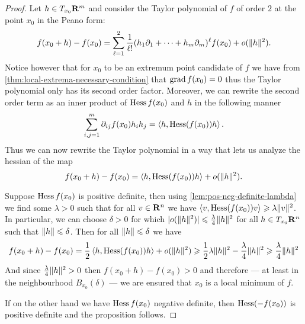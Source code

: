 \begin{proof}
  Let \(h \in T_{x_0}\mathbf{R}^m\) and consider the Taylor polynomial of \(f\) of order
  \(2\) at the point \(x_0\) in the Peano form:
  \[
    f(x_0 + h) - f(x_0) = \sum_{\ell=1}^2 \frac{1}{\ell!} (h_1 \partial_1 + \dots + h_m \partial_m)^{\ell}
    f(x_0) + o(\lVert h\rVert^2).
  \]
  Notice however that for \(x_0\) to be an extremum point candidate of \(f\) we
  have from \cref{thm:local-extrema-necessary-condition} that \(\operatorname{grad} f(x_0) =
  0\) thus the Taylor polynomial only has its second order factor. Moreover, we
  can rewrite the second order term as an inner product of \(\operatorname{Hess} f(x_0)\) and
  \(h\) in the following manner
  \[
    \sum_{i, j = 1}^m \partial_{ij} f(x_0) h_i h_j
    = \left\langle h, \operatorname{Hess}(f(x_0)) h \right\rangle.
  \]
  Thus we can now rewrite the Taylor polynomial in a way that lets us analyze
  the hessian of the map
  \[
    f(x_0 + h) - f(x_0) = \left\langle h, \operatorname{Hess}(f(x_0)) h \right\rangle + o(\lVert h\rVert^2).
  \]

  Suppose \(\operatorname{Hess} f(x_0)\) is positive definite, then using
  \cref{lem:pos-neg-definite-lambda} we find some \(\lambda > 0\) such that for all
  \(v \in \mathbf{R}^n\) we have \(\left\langle v, \operatorname{Hess}(f(x_0)) v \right\rangle \geqslant \lambda \lVert v\rVert^2\). In
  particular, we can choose \(\delta > 0\) for which \(|o(\lVert h\rVert^2)| \leqslant \frac{\lambda}{4}
  \lVert h\rVert^2\) for all \(h \in T_{x_0}\mathbf{R}^n\) such that \(\lVert h\rVert \leqslant \delta\). Then for
  all \(\lVert h\rVert \leqslant \delta\) we have
  \begin{align*}
    f(x_0 + h) - f(x_0)
    = \frac{1}{2} \left\langle h, \operatorname{Hess}(f(x_0)) h \right\rangle + o(\lVert h\rVert^2)
    \geqslant \frac{1}{2} \lambda \lVert h\rVert^2 - \frac{\lambda}{4} \lVert h\rVert^2
    \geqslant \frac{\lambda}{4} \lVert h\rVert^2
  \end{align*}
  And since \(\frac{\lambda}{4} \lVert h\rVert^2 > 0\) then \(f(x_{0} + h) - f(x_0) > 0\)
  and therefore --- at least in the neighbourhood \(B_{x_0}(\delta)\) --- we are ensured
  that \(x_0\) is a local minimum of \(f\).

  If on the other hand we have \(\operatorname{Hess} f(x_0)\) negative definite, then
  \(\operatorname{Hess}(-f(x_0))\) is positive definite and the proposition follows.


\end{proof}
